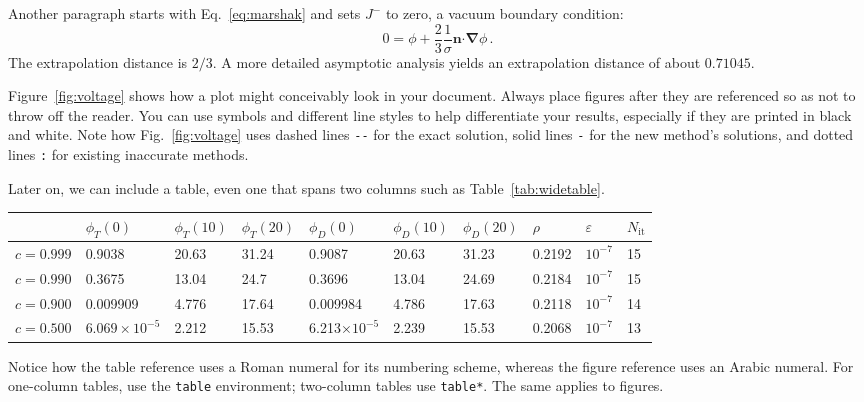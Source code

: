\documentclass[twoside,a4paper,12pt,english,draft]{anstrans}
\renewcommand{\vec}[1]{\bm{#1}} %
\newcommand{\vd}{\bm{\cdot}} %
\newcommand{\grad}{\vec{\nabla}} %
\begin{document}
Another paragraph starts with Eq.~\eqref{eq:marshak} and sets $J^-$ to zero, a
vacuum boundary condition:
\begin{equation*}
  0 = \phi + \frac{2}{3} \frac{1}{\sigma} \vec{n} \vd \grad \phi \,.
\end{equation*}
The extrapolation distance is $2/3$. A more detailed asymptotic analysis yields
an extrapolation distance of about $0.71045$.

Figure~\ref{fig:voltage} shows how a plot might conceivably look in your
document. Always place figures after they are referenced so as not to throw
off the reader. You can use symbols and different line styles to help
differentiate your results, especially if they are printed in black and white.
Note how Fig.~\ref{fig:voltage} uses dashed lines \verb|--| for the exact
solution, solid lines \verb|-| for the new method's solutions, and dotted lines
\verb|:| for existing inaccurate methods.


Later on, we can include a table, even one that spans two columns such as
Table~\ref{tab:widetable}.
\begin{table*}[htb]
  \centering
\begin{tabular}{llllllllll}\toprule
      & $\phi_T(0)$      & $\phi_T(10)$      & $\phi_T(20)$      &
      $\phi_D(0)$      & $\phi_D(10)$      & $\phi_D(20)$      & $\rho$      &
      $\varepsilon$      & $N_\text{it}$
\\ \midrule
$c=0.999$  & 0.9038 & 20.63 & 31.24 & 0.9087 & 20.63 & 31.23 & 0.2192 & $10^{-7}$ & 15
\\
$c=0.990$  & 0.3675 & 13.04 & 24.7 & 0.3696 & 13.04 & 24.69 & 0.2184 & $10^{-7}$ & 15
\\
$c=0.900$  & 0.009909 & 4.776 & 17.64 & 0.009984 & 4.786 & 17.63 & 0.2118 & $10^{-7}$ & 14
\\
$c=0.500$  & $6.069\times 10^{-5}$ & 2.212 & 15.53 & 6.213$\times 10^{-5}$ & 2.239 & 15.53 & 0.2068 & $10^{-7}$ & 13
\\
\bottomrule
\end{tabular}
  \caption{This is an example of a really wide table which might not normally
  fit in the document.}
  \label{tab:widetable}
\end{table*}
Notice how the table reference uses a Roman numeral
for its numbering scheme, whereas the figure reference uses an Arabic numeral.
For one-column tables, use the \verb|table| environment; two-column tables use
\verb|table*|. The same applies to figures.
\end{document}
